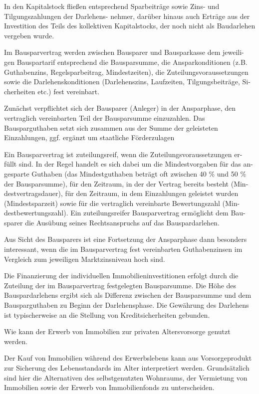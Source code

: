 In den Kapitalstock fließen entsprechend Sparbeiträge sowie Zins- und Tilgungszahlungen der Darlehens-
nehmer, darüber hinaus auch Erträge aus der Investition des Teils des kollektiven
Kapitalstocks, der noch nicht als Baudarlehen vergeben wurde.

Im Bausparvertrag werden zwischen Bausparer und Bausparkasse dem jeweili-
gen Bauspartarif entsprechend die Bausparsumme, die Ansparkonditionen (z.B.
Guthabenzins, Regelsparbeitrag, Mindestzeiten), die Zuteilungsvoraussetzungen
sowie die Darlehenskonditionen (Darlehenszins, Laufzeiten, Tilgungsbeiträge, Si-
cherheiten etc.) fest vereinbart.

Zunächst verpflichtet sich der Bausparer (Anleger) in der Ansparphase, den vertraglich vereinbarten Teil der Bausparsumme einzuzahlen. 
Das Bausparguthaben setzt sich zusammen aus der Summe der geleisteten Einzahlungen, ggf. ergänzt um staatliche Förderzulagen

Ein Bausparvertrag ist zuteilungsreif, wenn die Zuteilungsvoraussetzungen er-
füllt sind. In der Regel handelt es sich dabei um die Mindestvorgaben für das an-
gesparte Guthaben (das Mindestguthaben beträgt oft zwischen 40 \% und 50 \%
der Bausparsumme), für den Zeitraum, in der der Vertrag bereits besteht (Min-
destvertragsdauer), für den Zeitraum, in dem Einzahlungen geleistet wurden
(Mindestsparzeit) sowie für die vertraglich vereinbarte Bewertungszahl (Min-
destbewertungszahl). Ein zuteilungsreifer Bausparvertrag ermöglicht dem Bau-
sparer die Ausübung seines Rechtsanspruchs auf das Bauspardarlehen.

Aus Sicht des Bausparers ist eine Fortsetzung der Ansparphase dann besonders interessant, 
wenn die im Bausparvertrag fest vereinbarten Guthabenzinsen im Vergleich zum jeweiligen 
Marktzinsniveau hoch sind.

Die Finanzierung der individuellen Immobilieninvestitionen erfolgt durch die Zuteilung 
der im Bausparvertrag festgelegten Bausparsumme. Die Höhe des Bauspardarlehens ergibt sich 
als Differenz zwischen der Bausparsumme und dem Bausparguthaben zu Beginn der Darlehensphase. 
Die Gewährung des Darlehens ist typischerweise an die Stellung von Kreditsicherheiten gebunden.


Wie kann der Erwerb von Immobilien zur privaten Altersvorsorge genutzt werden.

Der Kauf von Immobilien während des Erwerbslebens kann aus Vorsorgeprodukt
zur Sicherung des Lebensstandards im Alter interpretiert werden. Grundsätzlich
sind hier die Alternativen des selbstgenutzten Wohnraums, der Vermietung von
Immobilien sowie der Erwerb von Immobilienfonds zu unterscheiden.



